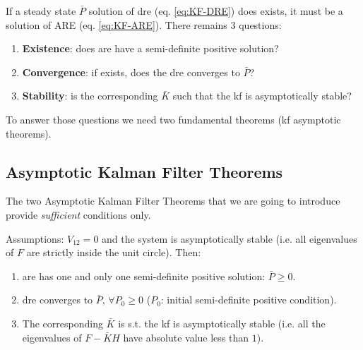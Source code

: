 If a steady state $\bar{P}$ solution of \gls{dre} (eq. \ref{eq:KF-DRE}) does exists, it must be a solution of ARE (eq. \ref{eq:KF-ARE}).
There remains 3 questions:
\begin{enumerate}
    \item \textbf{Existence}: does \gls{are} have a semi-definite positive solution?
    \item \textbf{Convergence}: if exists, does the \gls{dre} converges to $\bar{P}$?
    \item \textbf{Stability}: is the corresponding $\bar{K}$ such that the \gls{kf} is asymptotically stable?
\end{enumerate}


To answer those questions we need two fundamental theorems (\gls{kf} asymptotic theorems).

\subsection{Asymptotic Kalman Filter Theorems}
The two Asymptotic Kalman Filter Theorems that we are going to introduce provide \emph{sufficient} conditions only.

\begin{theorem}\label{th:1KF_as}
    Assumptions: $V_{12} = 0$ and the system is asymptotically stable (i.e. all eigenvalues of $F$ are strictly inside the unit circle).
    Then:
    \begin{enumerate}
        \item \gls{are} has one and only one semi-definite positive solution: $\bar{P} \ge 0$.
        \item \gls{dre} converges to $\bar{P}$, $\forall P_0 \ge 0$ ($P_0$: initial semi-definite positive condition).
        \item The corresponding $\bar{K}$ is s.t. the \gls{kf} is asymptotically stable (i.e. all the eigenvalues of $F-\bar{K}H$ have absolute value less than $1$).
    \end{enumerate}
\end{theorem}

